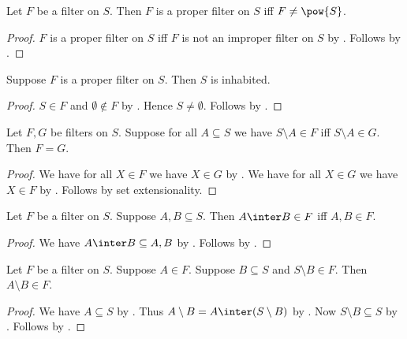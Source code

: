 \begin{theorem}\label{proper_filter_iff_not_powerset}
    Let $F$ be a filter on $S$.
    Then $F$ is a proper filter on $S$ iff $F\neq\pow{S}$.
\end{theorem}
\begin{proof}
    $F$ is a proper filter on $S$ iff
        $F$ is not an improper filter on $S$
        by .
    Follows by .
\end{proof}

\begin{proposition}\label{proper_filter_carrier_inhabited}
    Suppose $F$ is a proper filter on $S$.
    Then $S$ is inhabited.
\end{proposition}
\begin{proof}
    $S\in F$ and $\emptyset\notin F$
        by .
    Hence $S\neq\emptyset$.
    Follows by .
\end{proof}

\begin{proposition}\label{filter_ext_complement}
    Let $F, G$ be filters on $S$.
    Suppose for all $A\subseteq S$ we have $S\setminus A\in F$ iff $S\setminus A\in G$.
    Then $F = G$.
\end{proposition}
\begin{proof}
    We have for all $X\in F$ we have $X\in G$
        by .
    We have for all $X\in G$ we have $X\in F$
        by .
    Follows by set extensionality.
\end{proof}

\begin{proposition}\label{filter_inter_in_iff}
    Let $F$ be a filter on $S$.
    Suppose $A, B\subseteq S$.
    Then $A\inter B\in F$ iff $A, B\in F$.
\end{proposition}
\begin{proof}
    We have $A\inter B\subseteq A, B$ by .
    Follows by .
\end{proof}

\begin{proposition}\label{filter_setminus_in}
    Let $F$ be a filter on $S$.
    Suppose $A\in F$.
    Suppose $B\subseteq S$ and $S\setminus B\in F$.
    Then $A\setminus B\in F$.
\end{proposition}
\begin{proof}
    We have $A\subseteq S$ by .
    Thus $A\setminus B = A\inter (S\setminus B)$ by .
    Now $S\setminus B\subseteq S$ by .
    Follows by .
\end{proof}

